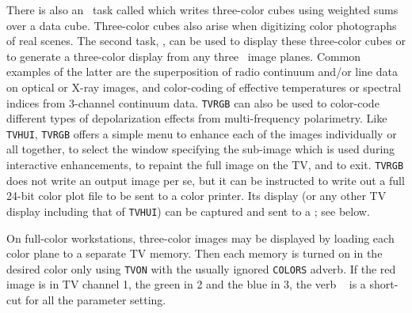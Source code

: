 There is also an \AIPS\ task called {\tt {}} which writes
three-color cubes using weighted sums over a data cube.  Three-color
cubes also arise when digitizing color photographs of real scenes.
The second task, {\tt {}}, can be used to display these
three-color cubes or to generate a three-color display from any three
\AIPS\ image planes. Common examples of the latter are the
superposition of radio continuum and/or line data on optical or X-ray
images, and color-coding of effective temperatures or spectral indices
from 3-channel continuum data.  {\tt TVRGB} can also be used to
color-code different types of depolarization effects from
multi-frequency polarimetry.  Like {\tt TVHUI}, {\tt TVRGB} offers a
simple menu to enhance each of the images individually or all
together, to select the window specifying the sub-image which is used
during interactive enhancements, to repaint the full image on the TV,
and to exit.  {\tt TVRGB} does not write an output image per se, but
it can be instructed to write out a full 24-bit color
 plot file to be sent to a color printer.  Its
display (or any other TV display including that of {\tt TVHUI}) can be
captured and sent to a ; see 
below.

      On full-color workstations, three-color images may be displayed
by loading each color plane to a separate TV memory.  Then each memory
is turned on in the desired color only using {\tt TVON} with the
usually ignored {\tt COLORS} adverb.  If the red image is in TV
channel 1, the green in 2 and the blue in 3, the verb {\tt
{}} is a short-cut for all the parameter setting.
\pd


